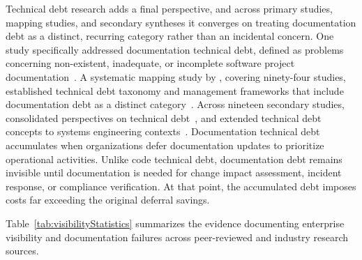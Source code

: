 Technical debt research adds a final perspective, and across primary studies, mapping studies, and secondary syntheses it converges on treating documentation debt as a distinct, recurring category rather than an incidental concern. One study specifically addressed documentation technical debt, defined as problems concerning non-existent, inadequate, or incomplete software project documentation~\parencite{Santos_2019}. A systematic mapping study by \citeauthor{Li_Avgeriou_Liang_2015}, covering ninety-four studies, established technical debt taxonomy and management frameworks that include documentation debt as a distinct category~\parencite{Li_Avgeriou_Liang_2015}. Across nineteen secondary studies, \citeauthor{Junior_Travassos_2022} consolidated perspectives on technical debt~\parencite{Junior_Travassos_2022}, and \citeauthor{Kleinwaks_2023} extended technical debt concepts to systems engineering contexts~\parencite{Kleinwaks_2023}. Documentation technical debt accumulates when organizations defer documentation updates to prioritize operational activities. Unlike code technical debt, documentation debt remains invisible until documentation is needed for change impact assessment, incident response, or compliance verification. At that point, the accumulated debt imposes costs far exceeding the original deferral savings.

Table~\ref{tab:visibilityStatistics} summarizes the evidence documenting enterprise visibility and documentation failures across peer-reviewed and industry research sources.

